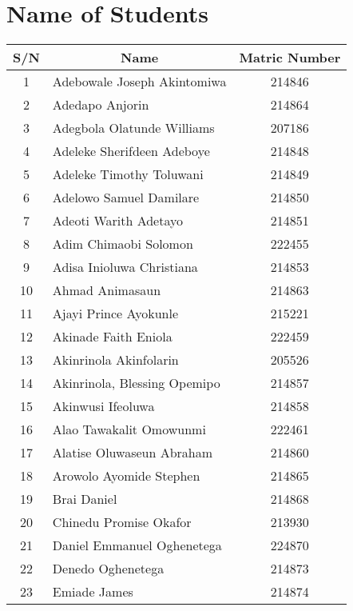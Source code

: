 \documentclass[a4paper]{article}
\begin{document}
    \section*{Name of Students}
    \begin{center}
        \Large
        \begin{longtable} { c|l|c }
            \toprule[2pt]
            S/N & \multicolumn{1}{|c|}{Name} & Matric Number \\
            \midrule
            1 & Adebowale Joseph Akintomiwa & 214846\\
            2 & Adedapo Anjorin & 214864\\
            3 & Adegbola Olatunde Williams & 207186\\
            4 & Adeleke Sherifdeen Adeboye & 214848\\
            5 & Adeleke Timothy Toluwani & 214849\\
            6 & Adelowo Samuel Damilare & 214850\\
            7 & Adeoti Warith Adetayo & 214851\\
            8 & Adim Chimaobi Solomon & 222455\\
            9 & Adisa Inioluwa Christiana & 214853\\
            10 & Ahmad Animasaun & 214863\\
            11 & Ajayi Prince Ayokunle & 215221\\
            12 & Akinade Faith Eniola & 222459\\
            13 & Akinrinola Akinfolarin & 205526\\
            14 & Akinrinola, Blessing Opemipo & 214857\\
            15 & Akinwusi Ifeoluwa & 214858\\
            16 & Alao Tawakalit Omowunmi & 222461\\
            17 & Alatise Oluwaseun Abraham & 214860\\
            18 & Arowolo Ayomide Stephen & 214865\\
            19 & Brai Daniel & 214868\\
            20 & Chinedu Promise Okafor & 213930\\
            21 & Daniel Emmanuel Oghenetega & 224870\\
            22 & Denedo Oghenetega & 214873\\
            23 & Emiade James & 214874\\

\end{longtable}
\end{center}
\end{document}
